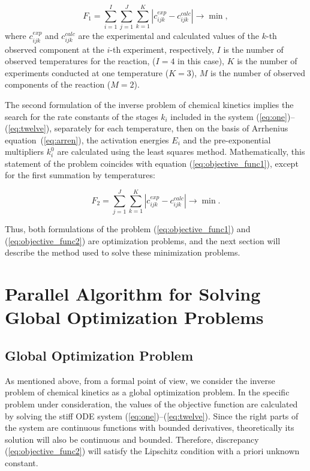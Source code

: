 \documentclass{svproc}
\begin{document}
\begin{equation}
  F_1 = \sum_{i=1}^I \sum_{j=1}^J \sum_{k=1}^K \left| c_{ijk}^{exp} - c_{ijk}^{calc} \right| \longrightarrow \min,
  \label{eq:objective_func1}
\end{equation}
where $c_{ijk}^{exp}$ and $c_{ijk}^{calc}$ are the experimental and calculated values of the $k$-th observed component at the $i$-th experiment, respectively, $I$ is the number of observed temperatures for the reaction, ($I = 4$ in this case), $K$ is the number of experiments conducted at one temperature ($K = 3$), $M$ is the number of observed components of the reaction ($M = 2$).

The second formulation of the inverse problem of chemical kinetics implies the search for the rate constants of the stages $k_i$ included in the system (\ref{eq:one})--(\ref{eq:twelve}), separately for each temperature, then on the basis of Arrhenius equation~(\ref{eq:arren}), the activation energies $E_i$ and the pre-exponential multipliers $k_i^0$ are calculated using the least squares method. Mathematically, this statement of the problem coincides with equation (\ref{eq:objective_func1}), except for the first summation by temperatures:

\begin{equation}
  F_2 = \sum_{j=1}^J \sum_{k=1}^K \left| c_{ijk}^{exp} - c_{ijk}^{calc} \right| \longrightarrow \min.
  \label{eq:objective_func2} 
\end{equation}

Thus, both formulations of the problem (\ref{eq:objective_func1}) and (\ref{eq:objective_func2}) are optimization problems, and the next section will describe the method used to solve these minimization problems.

\section{Parallel Algorithm for Solving Global Optimization Problems }\label{Sec_GSA}

\subsection{Global Optimization Problem}

As mentioned above, from a formal point of view, we consider the inverse problem of chemical kinetics as a global optimization problem. 
In the specific problem under consideration, the values of the objective function are calculated by solving the stiff ODE system (\ref{eq:one})--(\ref{eq:twelve}). Since the right parts of the system are continuous functions with bounded derivatives, theoretically its solution will also be continuous and bounded. Therefore, discrepancy (\ref{eq:objective_func2}) will satisfy the Lipschitz condition with a priori unknown constant.
\end{document}
